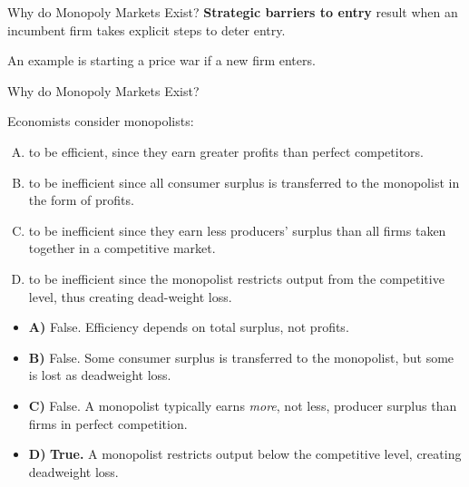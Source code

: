 \documentclass{beamer}
\begin{document}
\begin{frame}{Why do Monopoly Markets Exist?}
  \textbf{Strategic barriers to entry} result when an incumbent firm takes explicit steps to deter entry.

  \bigskip
  An example is starting a price war if a new firm enters.
\end{frame}

\begin{frame}{Why do Monopoly Markets Exist?}


  Economists consider monopolists:

  \begin{enumerate}[A)]
    \item to be efficient, since they earn greater profits than perfect competitors.
    \item to be inefficient since all consumer surplus is transferred to the monopolist in the form of profits.
    \item to be inefficient since they earn less producers' surplus than all firms taken together in a competitive market.
    \item to be inefficient since the monopolist restricts output from the competitive level, thus creating dead-weight loss.
  \end{enumerate}
\end{frame}

\begin{frame}


\bigskip

\begin{itemize}
    \item \textbf{A)} False. Efficiency depends on total surplus, not profits.
    
    \item \textbf{B)} False. Some consumer surplus is transferred to the monopolist, but some is lost as deadweight loss.
    
    \item \textbf{C)} False. A monopolist typically earns \emph{more}, not less, producer surplus than firms in perfect competition.
    
    \item \textbf{D)} \textbf{True.} A monopolist restricts output below the competitive level, creating deadweight loss.
\end{itemize}

\bigskip
\begin{center}
\end{center}

\end{frame}
\end{document}
